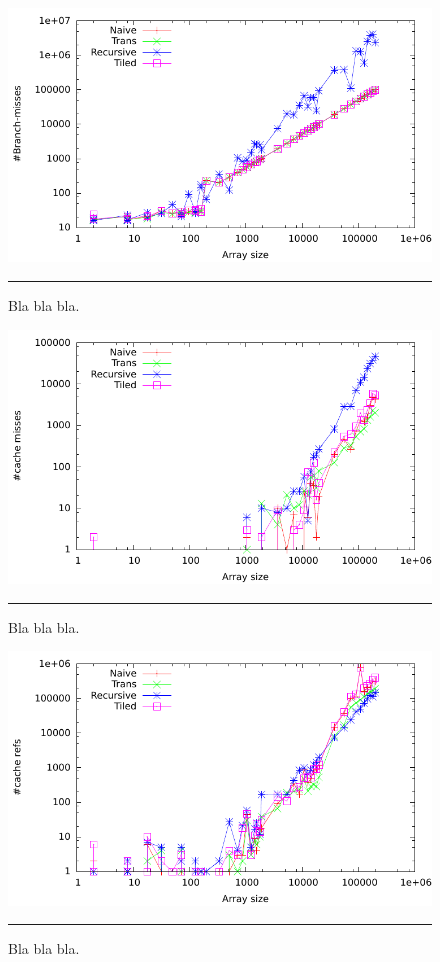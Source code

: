 \begin{figure}[htbp]
	\centering
		\includegraphics[width=\textwidth]{./Figures/Project2a/Branch_misses.pdf}
		\rule{35em}{0.5pt}
	\caption[Branch misses]{
	Bla bla bla.
	}
	\label{fig:Branch_misses_p2a}
\end{figure}


\begin{figure}[htbp]
	\centering
		\includegraphics[width=\textwidth]{./Figures/Project2a/Cache_misses.pdf}
		\rule{35em}{0.5pt}
	\caption[Cache misses]{
	Bla bla bla.
	}
	\label{fig:Cache_misses_p2a}
\end{figure}



\begin{figure}[htbp]
	\centering
		\includegraphics[width=\textwidth]{./Figures/Project2a/Cache_refs.pdf}
		\rule{35em}{0.5pt}
	\caption[Cache refs]{
	Bla bla bla.
	}
	\label{fig:Cache_refs_p2a}
\end{figure}



